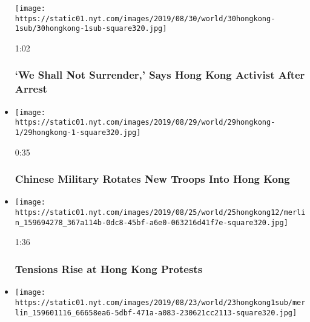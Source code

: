 \begin{itemize}
  \texttt{[image: https://static01.nyt.com/images/2019/08/30/world/30hongkong-1sub/30hongkong-1sub-square320.jpg]}

  1:02

  \hypertarget{we-shall-not-surrender-says-hong-kong-activist-after-arrest}{%
  \subsubsection{`We Shall Not Surrender,' Says Hong Kong Activist After
  Arrest}\label{we-shall-not-surrender-says-hong-kong-activist-after-arrest}}
\item
  \href{https://www.nytimes.com/video/world/asia/100000006687546/china-military-hong-kong.html?action=click\&module=video-series-bar\&region=header\&pgtype=Article\&playlistId=video/hk-protest}{}

  \texttt{[image: https://static01.nyt.com/images/2019/08/29/world/29hongkong-1/29hongkong-1-square320.jpg]}

  0:35

  \hypertarget{chinese-military-rotates-new-troops-into-hong-kong}{%
  \subsubsection{Chinese Military Rotates New Troops Into Hong
  Kong}\label{chinese-military-rotates-new-troops-into-hong-kong}}
\item
  \href{https://www.nytimes.com/video/world/asia/100000006679951/hong-kong-protests.html?action=click\&module=video-series-bar\&region=header\&pgtype=Article\&playlistId=video/hk-protest}{}

  \texttt{[image: https://static01.nyt.com/images/2019/08/25/world/25hongkong12/merlin\_159694278\_367a114b-0dc8-45bf-a6e0-063216d41f7e-square320.jpg]}

  1:36

  \hypertarget{tensions-rise-at-hong-kong-protests}{%
  \subsubsection{Tensions Rise at Hong Kong
  Protests}\label{tensions-rise-at-hong-kong-protests}}
\item
  \href{https://www.nytimes.com/video/world/asia/100000006677711/hong-kong-human-chain.html?action=click\&module=video-series-bar\&region=header\&pgtype=Article\&playlistId=video/hk-protest}{}

  \texttt{[image: https://static01.nyt.com/images/2019/08/23/world/23hongkong1sub/merlin\_159601116\_66658ea6-5dbf-471a-a083-230621cc2113-square320.jpg]}


\end{itemize}
